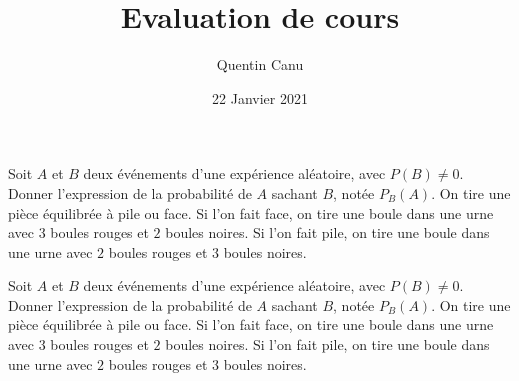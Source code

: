 \documentclass{exam}
\title{Evaluation de cours}
\date{22 Janvier 2021}
\author{Quentin Canu}
\begin{document}
\begin{questions}
\question Soit $A$ et $B$ deux événements d'une expérience aléatoire, avec $P(B) \neq 0$. Donner l'expression de la probabilité de $A$ sachant $B$, notée $P_B(A)$.
\vspace*{0.5cm}
\question On tire une pièce équilibrée à pile ou face. Si l'on fait face, on tire une boule dans une urne avec $3$ boules rouges et $2$ boules noires. Si l'on fait pile, on tire une boule dans une urne avec $2$ boules rouges et $3$ boules noires.
\end{questions}
\vspace*{1cm}
\begin{questions}
\question Soit $A$ et $B$ deux événements d'une expérience aléatoire, avec $P(B) \neq 0$. Donner l'expression de la probabilité de $A$ sachant $B$, notée $P_B(A)$.
\vspace*{0.5cm}
\question On tire une pièce équilibrée à pile ou face. Si l'on fait face, on tire une boule dans une urne avec $3$ boules rouges et $2$ boules noires. Si l'on fait pile, on tire une boule dans une urne avec $2$ boules rouges et $3$ boules noires.
\end{questions}
\vspace*{1cm}
\end{document}
